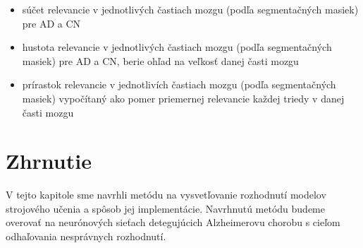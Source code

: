 \begin{itemize}
    \item súčet relevancie v jednotlivých častiach mozgu (podľa segmentačných masiek) pre AD a CN
    \item hustota relevancie v jednotlivých častiach mozgu (podľa segmentačných masiek) pre AD a CN, berie ohľad na veľkosť danej časti mozgu
    \item prírastok relevancie v jednotlivích častiach mozgu (podľa segmentačných masiek) vypočítaný ako pomer priemernej relevancie každej triedy v danej časti mozgu
\end{itemize}

\section{Zhrnutie}

V tejto kapitole sme navrhli metódu na vysvetľovanie rozhodnutí modelov strojového učenia a spôsob jej implementácie. Navrhnutú metódu budeme overovať na neurónových sieťach detegujúcich Alzheimerovu chorobu s cieľom odhaľovania nesprávnych rozhodnutí.
